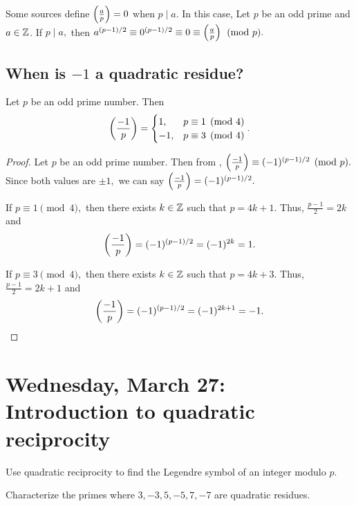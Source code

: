 \documentclass[letterpaper, 11 pt]{ximera}
\begin{document}
\begin{remark}
	Some sources define $\left(\frac{a}{p}\right)=0$ when $p\mid a.$ In this case,  Let $p$ be an odd prime and $a\in\mathbb Z$.
	If $p\mid a,$ then $a^{(p-1)/2}\equiv 0^{(p-1)/2}\equiv 0\equiv\left(\frac{a}{p}\right)\pmod{p}.$
\end{remark}

\subsection{When is $-1$ a quadratic residue?}

\begin{thm*}[Theorem 4.6]\label{thm:residue-neg1}
	Let $p$ be an odd prime number. Then 
	\[
		\left(\frac{-1}{p}\right)=
			\begin{cases}
 				1, & p\equiv 1\pmod{4}\\
				-1, & p\equiv 3\pmod{4}
			\end{cases}.
	\]
\end{thm*}

\begin{proof}
	Let $p$ be an odd prime number. Then from , $\left(\frac{-1}{p}\right)\equiv (-1)^{(p-1)/2}\pmod{p}.$ Since both values are $\pm1,$ we can say $\left(\frac{-1}{p}\right)=(-1)^{(p-1)/2}.$

	If $p\equiv 1\pmod{4},$ then there exists $k\in\mathbb Z$ such that $p=4k+1.$ Thus, $\frac{p-1}{2}=2k$ and 
		\[
			\left(\frac{-1}{p}\right)=(-1)^{(p-1)/2}=(-1)^{2k}=1.
		\]
	
	If $p\equiv 3\pmod{4},$ then there exists $k\in\mathbb Z$ such that $p=4k+3.$ Thus, $\frac{p-1}{2}=2k+1$ and 
		\[
			\left(\frac{-1}{p}\right)=(-1)^{(p-1)/2}=(-1)^{2k+1}=-1.
		\]
\end{proof}
\section{Wednesday, March 27: Introduction to quadratic reciprocity}

\begin{obj}
    \item Use quadratic reciprocity to find the Legendre symbol of an integer modulo $p$.
    \item Characterize the primes where $3,-3,5,-5,7,-7$ are quadratic residues.
\end{obj}
\end{document}
